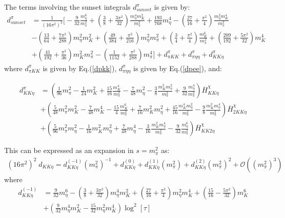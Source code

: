 \documentclass[12pt,a4paper]{article}
\begin{document}
The terms involving the sunset integrals ${d}^{\pi}_{sunset}$ is given by:
\begin{align}
	{d}^{\pi}_{sunset} &= \frac{1}{(16 \pi^2)^2} \bigg[
	- \frac{9}{32} \frac{m_{\eta}^6}{m_{\pi}^2} + \left( \frac{3}{8}+\frac{3 \pi ^2}{32}\right) \frac{ m_{\eta}^4 m_{K}^2 }{m_{\pi}^2}+\frac{193}{768} m_{\eta}^4 - \left(\frac{27}{16}+\frac{\pi^2}{4}\right) \frac{ m_{\eta}^2 m_{K}^4}{m_{\pi}^2} \nonumber \\
	& - \left(\frac{13}{64}+\frac{7 \pi ^2}{288}\right) m_{\eta}^2 m_{K}^2+\left(\frac{49}{384}+\frac{\pi^2}{216}\right) m_{\eta}^2 m_{\pi}^2 + \left(\frac{3}{4}+\frac{\pi ^2}{4}\right) \frac{m_{K}^6}{m_{\pi}^2} + \left(\frac{209}{192}+\frac{5 \pi ^2}{32}\right) m_{K}^4 \nonumber \\
	& + \left(\frac{41}{192}+\frac{\pi ^2}{36}\right) m_{K}^2 m_{\pi}^2-\left(\frac{1}{1152}+\frac{\pi ^2}{288}\right) m_{\pi}^4 \bigg] + {d}^{\pi}_{\pi K K} + {d}^{\pi}_{\pi \eta \eta} + {d}^{\pi}_{K K \eta}
\label{dsunset}
\end{align}
where ${d}^{\pi}_{\pi K K}$ is given by Eq.(\ref{dpkk}), ${d}^{\pi}_{\pi \eta \eta}$ is given by Eq.(\ref{dpee}), and:

\begin{align}
\label{dkke}
	{d}^{\pi}_{K K \eta} & = \left( \frac{1}{96} m_{\pi}^2 - \frac{1}{24} m_{K}^2 + \frac{15}{16} \frac{m_{K}^4}{m_{\pi}^2} - \frac{7}{48} m_{\eta}^2 - \frac{3}{8} \frac{m_{K}^2 m_{\eta}^2}{m_{\pi}^2} + \frac{9}{32} \frac{m_{\eta}^4}{m_{\pi}^2} \right) \overline{H}^{\chi}_{K K \eta} \nonumber \\
	& + \left( \frac{5}{48} m_{\pi}^2 m_{K}^2 - \frac{7}{48} m_{K}^4 - \frac{15}{4} \frac{m_{K}^6}{ m_{\pi}^2} + \frac{7}{16} m_{K}^2 m_{\eta}^2 +\frac{45}{16} \frac{m_{K}^4 m_{\eta}^2}{m_{\pi}^2} -\frac{9}{8} \frac{m_{K}^2 m_{\eta}^4}{m_{\pi}^2} \right) \overline{H}^{\chi}_{2K K \eta} \nonumber \\	
	& + \left( \frac{5}{96} m_{\pi}^2 m_{\eta}^2 - \frac{1}{16} m_{K}^2 m_{\eta}^2 + \frac{7}{48} m_{\eta}^4 - \frac{3}{16} \frac{m_{K}^2 m_{\eta}^4}{m_{\pi}^2} - \frac{9}{32} \frac{m_{\eta}^6}{m_{\pi}^2} \right) \overline{H}^{\chi}_{K K 2\eta}
\end{align}

This can be expressed as an expansion in $s=m_{\pi}^2$ as:
\begin{align}
	(16 \pi^2)^2 \; {d}_{K K \eta} = {d}_{K K \eta}^{(-1)} (m_{\pi}^2)^{-1} + {d}_{K K \eta}^{(0)} + {d}_{K K \eta}^{(1)} (m_{\pi}^2) + {d}_{K K \eta}^{(2)} (m_{\pi}^2)^2 + \mathcal{O} \left( (m_{\pi}^2)^3 \right)
\end{align}
where
\begin{align}
	{d}_{K K \eta}^{(-1)} &= \frac{9}{32} m_{\eta}^6 - \left(\frac{3}{8}+\frac{3 \pi^2}{32}\right) m_{\eta}^4 m_{K}^2 + \left(\frac{27}{16}+\frac{\pi^2}{4}\right) m_{\eta}^2 m_{K}^4 + \left(\frac{15}{16}-\frac{5 \pi^2}{32}\right) m_{K}^6 \nonumber \\
	& + \left(\frac{9}{32} m_{\eta}^4 m_{K}^2 - \frac{15}{32} m_{\eta}^2 m_{K}^4 \right) \log^2[\tau] 
\end{align}
\end{document}
